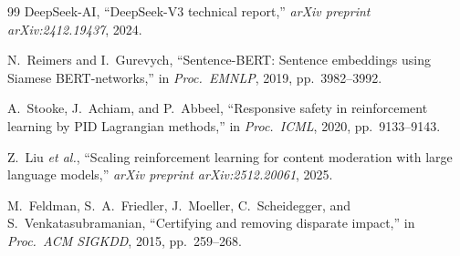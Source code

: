 \documentclass[journal]{IEEEtran}
\begin{document}
\begin{thebibliography}{99}
  DeepSeek-AI,
  ``DeepSeek-V3 technical report,''
  \textit{arXiv preprint arXiv:2412.19437}, 2024.

  N.~Reimers and I.~Gurevych,
  ``Sentence-BERT: Sentence embeddings using Siamese BERT-networks,''
  in \textit{Proc.\ EMNLP}, 2019, pp.~3982--3992.

  A.~Stooke, J.~Achiam, and P.~Abbeel,
  ``Responsive safety in reinforcement learning by PID Lagrangian methods,''
  in \textit{Proc.\ ICML}, 2020, pp.~9133--9143.

  Z.~Liu \textit{et al.},
  ``Scaling reinforcement learning for content moderation with large language models,''
  \textit{arXiv preprint arXiv:2512.20061}, 2025.

  M.~Feldman, S.~A.~Friedler, J.~Moeller, C.~Scheidegger, and S.~Venkatasubramanian,
  ``Certifying and removing disparate impact,''
  in \textit{Proc.\ ACM SIGKDD}, 2015, pp.~259--268.

\end{thebibliography}
\end{document}
